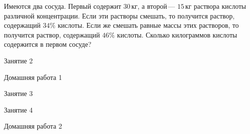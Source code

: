 \begin{class}[number=1]
\begin{listofex}
		
		\item Имеются два сосуда. Первый содержит \(30\) кг, а второй --- \(15\) кг раствора кислоты различной концентрации. Если эти растворы смешать, то получится раствор, содержащий \(34\%\) кислоты. Если же смешать равные массы этих растворов, то получится раствор, содержащий \(46\%\) кислоты. Сколько килограммов кислоты содержится в первом сосуде?
	\end{listofex}
\end{class}

\begin{class}[number=2]
	\begin{listofex}
		\item Занятие 2
	\end{listofex}
\end{class}

\begin{homework}[number=1]
	\begin{listofex}
		\item Домашняя работа 1
	\end{listofex}
\end{homework}

\begin{class}[number=3]
	\begin{listofex}
		\item Занятие 3 
	\end{listofex}
\end{class}

\begin{class}[number=4]
	\begin{listofex}
		\item Занятие 4
	\end{listofex}
\end{class}

\begin{homework}[number=2]
	\begin{listofex}
		\item Домашняя работа 2
	\end{listofex}
\end{homework}

